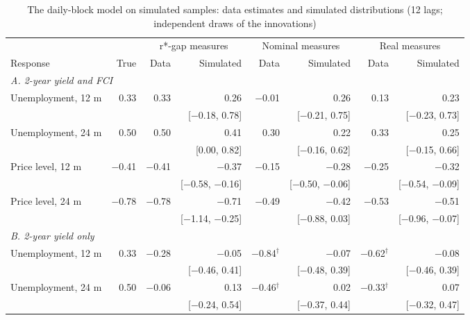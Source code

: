 \begin{table}[H]\centering\footnotesize\setlength{\tabcolsep}{3pt}
\caption{The daily-block model on simulated samples: data estimates and simulated distributions (12 lags; independent draws of the innovations)}\label{tab:dailysimiid}
\begin{tabular}{lrrrrrrr}\toprule & & \multicolumn{2}{c}{r*-gap measures} & \multicolumn{2}{c}{Nominal measures} & \multicolumn{2}{c}{Real measures}\\ \cmidrule(lr){3-4}\cmidrule(lr){5-6}\cmidrule(lr){7-8}
Response & True & Data & Simulated & Data & Simulated & Data & Simulated\\ \midrule
\multicolumn{8}{l}{\textit{A. 2-year yield and FCI}}\\
\quad Unemployment, 12 m & 0.33 & 0.33 & 0.26 & $-$0.01 & 0.26 & 0.13 & 0.23\\
 &  &  & {\scriptsize [$-$0.18, 0.78]} &  & {\scriptsize [$-$0.21, 0.75]} &  & {\scriptsize [$-$0.23, 0.73]}\\
\quad Unemployment, 24 m & 0.50 & 0.50 & 0.41 & 0.30 & 0.22 & 0.33 & 0.25\\
 &  &  & {\scriptsize [0.00, 0.82]} &  & {\scriptsize [$-$0.16, 0.62]} &  & {\scriptsize [$-$0.15, 0.66]}\\
\quad Price level, 12 m & $-$0.41 & $-$0.41 & $-$0.37 & $-$0.15 & $-$0.28 & $-$0.25 & $-$0.32\\
 &  &  & {\scriptsize [$-$0.58, $-$0.16]} &  & {\scriptsize [$-$0.50, $-$0.06]} &  & {\scriptsize [$-$0.54, $-$0.09]}\\
\quad Price level, 24 m & $-$0.78 & $-$0.78 & $-$0.71 & $-$0.49 & $-$0.42 & $-$0.53 & $-$0.51\\
 &  &  & {\scriptsize [$-$1.14, $-$0.25]} &  & {\scriptsize [$-$0.88, 0.03]} &  & {\scriptsize [$-$0.96, $-$0.07]}\\
\multicolumn{8}{l}{\textit{B. 2-year yield only}}\\
\quad Unemployment, 12 m & 0.33 & $-$0.28 & $-$0.05 & $-$0.84$^{\dagger}$ & $-$0.07 & $-$0.62$^{\dagger}$ & $-$0.08\\
 &  &  & {\scriptsize [$-$0.46, 0.41]} &  & {\scriptsize [$-$0.48, 0.39]} &  & {\scriptsize [$-$0.46, 0.39]}\\
\quad Unemployment, 24 m & 0.50 & $-$0.06 & 0.13 & $-$0.46$^{\dagger}$ & 0.02 & $-$0.33$^{\dagger}$ & 0.07\\
 &  &  & {\scriptsize [$-$0.24, 0.54]} &  & {\scriptsize [$-$0.37, 0.44]} &  & {\scriptsize [$-$0.32, 0.47]}\\

\end{tabular}
\end{table}

